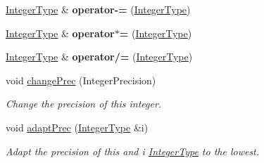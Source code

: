\begin{DoxyCompactItemize}
\hyperlink{classfap_1_1IntegerType}{Integer\+Type} \& {\bfseries operator-\/=} (\hyperlink{classfap_1_1IntegerType}{Integer\+Type})
\item 
\hypertarget{classfap_1_1IntegerType_a59cf32dd2fd3d40f0dad1298ae8ab695}{}\label{classfap_1_1IntegerType_a59cf32dd2fd3d40f0dad1298ae8ab695} 
\hyperlink{classfap_1_1IntegerType}{Integer\+Type} \& {\bfseries operator$\ast$=} (\hyperlink{classfap_1_1IntegerType}{Integer\+Type})
\item 
\hypertarget{classfap_1_1IntegerType_a8cca2cd5d84bdbd07ef50136c0080d89}{}\label{classfap_1_1IntegerType_a8cca2cd5d84bdbd07ef50136c0080d89} 
\hyperlink{classfap_1_1IntegerType}{Integer\+Type} \& {\bfseries operator/=} (\hyperlink{classfap_1_1IntegerType}{Integer\+Type})
\item 
\hypertarget{classfap_1_1IntegerType_a5bd62775586223484f294471638d2752}{}\label{classfap_1_1IntegerType_a5bd62775586223484f294471638d2752} 
void \hyperlink{classfap_1_1IntegerType_a5bd62775586223484f294471638d2752}{change\+Prec} (Integer\+Precision)
\begin{DoxyCompactList}\small\item\em Change the precision of this integer. \end{DoxyCompactList}\item 
\hypertarget{classfap_1_1IntegerType_a4386e9a24064ec296049c64b4fe6c50f}{}\label{classfap_1_1IntegerType_a4386e9a24064ec296049c64b4fe6c50f} 
void \hyperlink{classfap_1_1IntegerType_a4386e9a24064ec296049c64b4fe6c50f}{adapt\+Prec} (\hyperlink{classfap_1_1IntegerType}{Integer\+Type} \&i)
\begin{DoxyCompactList}\small\item\em Adapt the precision of this and {\ttfamily i} \hyperlink{classfap_1_1IntegerType}{Integer\+Type} to the lowest. \end{DoxyCompactList}\end{DoxyCompactItemize}
